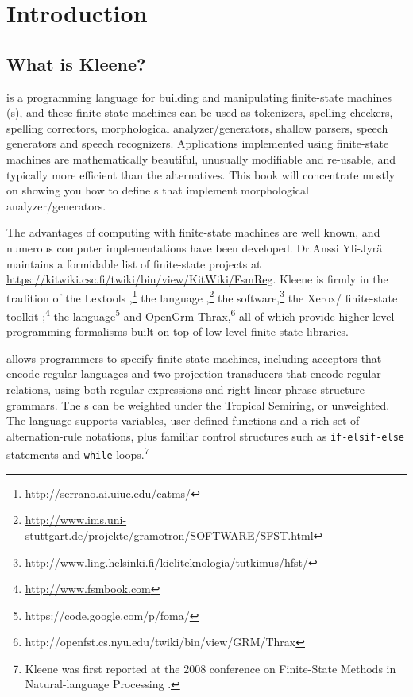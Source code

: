 \chapter{Introduction}

\section{What is Kleene?}

\Kleene{} is a programming language for building and manipulating
finite-state machines (\fsm{}s), and these finite-state machines can be
used as tokenizers, spelling checkers, spelling correctors,
morphological analyzer\slash{}generators, shallow parsers, speech generators
and speech recognizers.
Applications implemented using finite-state machines are mathematically
beautiful, unusually modifiable and re-usable, and typically more
efficient than the alternatives.  This book will concentrate mostly on
showing you how to define
\fsm{}s that implement morphological analyzer/generators.

The advantages of computing with finite-state machines are well known,
and numerous computer implementations have been developed.  Dr.\@ Anssi
Yli-Jyrä maintains a formidable list of finite-state projects at
\url{https://kitwiki.csc.fi/twiki/bin/view/KitWiki/FsmReg}.  Kleene is
firmly in the tradition of the  Lextools
\citep{roark+sproat:2007},\footnote{\url{http://serrano.ai.uiuc.edu/catms/}}
the  language
\citep{schmid:2005},\footnote{\url{http://www.ims.uni-stuttgart.de/projekte/gramotron/SOFTWARE/SFST.html}}
the 
software,\footnote{\url{http://www.ling.helsinki.fi/kieliteknologia/tutkimus/hfst/}}
the Xerox/ finite-state toolkit
\citep{beesley+karttunen:2003};\footnote{\url{http://www.fsmbook.com}}
the  language\footnote{https://code.google.com/p/foma/}
and
OpenGrm-Thrax,\footnote{http://openfst.cs.nyu.edu/twiki/bin/view/GRM/Thrax}
all of which provide higher-level programming formalisms built on top of
low-level finite-state libraries.  

\Kleene{} allows programmers to
specify finite-state machines, including acceptors that encode
regular languages and two-projection transducers that encode regular
relations, using both regular expressions and right-linear
phrase-structure grammars. The \fsm{}s can be weighted under the
Tropical Semiring, or unweighted.  The language supports variables, 
user-defined functions and a rich set of alternation-rule notations, 
plus familiar control structures such as \verb!if-elsif-else!
statements and \verb!while! loops.\footnote{Kleene was first reported
at the 2008 conference on Finite-State Methods in Natural-language
Processing \citep{beesley:2009}.}

